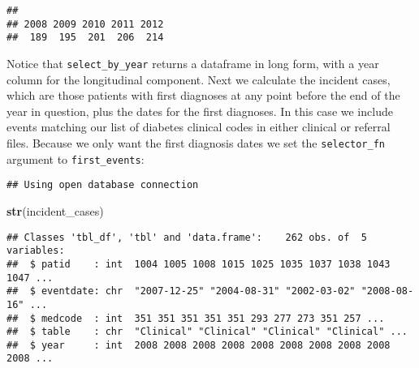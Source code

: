 \documentclass[]{article}
\newenvironment{Shaded}{\begin{snugshade}}{\end{snugshade}}
\newcommand{\KeywordTok}[1]{\textcolor[rgb]{0.13,0.29,0.53}{\textbf{{#1}}}}
\newcommand{\DataTypeTok}[1]{\textcolor[rgb]{0.13,0.29,0.53}{{#1}}}
\newcommand{\DecValTok}[1]{\textcolor[rgb]{0.00,0.00,0.81}{{#1}}}
\newcommand{\StringTok}[1]{\textcolor[rgb]{0.31,0.60,0.02}{{#1}}}
\newcommand{\NormalTok}[1]{{#1}}
\begin{document}
\begin{verbatim}
## 
## 2008 2009 2010 2011 2012 
##  189  195  201  206  214
\end{verbatim}

Notice that \texttt{select\_by\_year} returns a dataframe in long form,
with a year column for the longitudinal component. Next we calculate the
incident cases, which are those patients with first diagnoses at any
point before the end of the year in question, plus the dates for the
first diagnoses. In this case we include events matching our list of
diabetes clinical codes in either clinical or referral files. Because we
only want the first diagnosis dates we set the \texttt{selector\_fn}
argument to \texttt{first\_events}:

\begin{Shaded}
\end{Shaded}

\begin{verbatim}
## Using open database connection
\end{verbatim}

\begin{Shaded}
\begin{Highlighting}[]
\KeywordTok{str}\NormalTok{(incident_cases)}
\end{Highlighting}
\end{Shaded}

\begin{verbatim}
## Classes 'tbl_df', 'tbl' and 'data.frame':    262 obs. of  5 variables:
##  $ patid    : int  1004 1005 1008 1015 1025 1035 1037 1038 1043 1047 ...
##  $ eventdate: chr  "2007-12-25" "2004-08-31" "2002-03-02" "2008-08-16" ...
##  $ medcode  : int  351 351 351 351 351 293 277 273 351 257 ...
##  $ table    : chr  "Clinical" "Clinical" "Clinical" "Clinical" ...
##  $ year     : int  2008 2008 2008 2008 2008 2008 2008 2008 2008 2008 ...
\end{verbatim}
\end{document}

